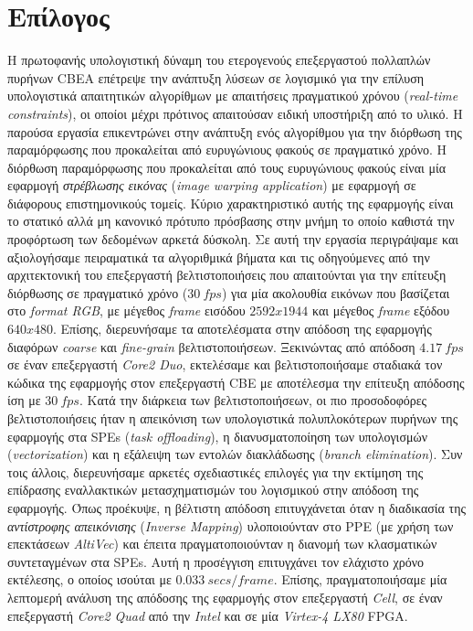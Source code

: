 ﻿\chapter{Επίλογος}
\label{chapter:chap7}
\indent
Η πρωτοφανής υπολογιστική δύναμη του ετερογενούς επεξεργαστού πολλαπλών πυρήνων \acf{CBEA} επέτρεψε την ανάπτυξη λύσεων σε λογισμικό για την επίλυση υπολογιστικά απαιτητικών αλγορίθμων με απαιτήσεις πραγματικού χρόνου (\textsl{real-time constraints}), οι οποίοι μέχρι πρότινος απαιτούσαν ειδική υποστήριξη από το υλικό. Η παρούσα εργασία επικεντρώνει στην ανάπτυξη ενός αλγορίθμου για την διόρθωση της παραμόρφωσης που προκαλείται από ευρυγώνιους φακούς σε πραγματικό χρόνο. Η διόρθωση παραμόρφωσης που προκαλείται από τους ευρυγώνιους φακούς είναι μία εφαρμογή \textsl{στρέβλωσης εικόνας} (\textsl{image warping application}) με εφαρμογή σε διάφορους επιστημονικούς τομείς. Κύριο χαρακτηριστικό αυτής της εφαρμογής είναι το στατικό αλλά μη κανονικό πρότυπο πρόσβασης στην μνήμη το οποίο καθιστά την προφόρτωση των δεδομένων αρκετά δύσκολη.\newline \indent
Σε αυτή την εργασία περιγράψαμε και αξιολογήσαμε πειραματικά τα αλγοριθμικά βήματα και τις οδηγούμενες από την αρχιτεκτονική του επεξεργαστή βελτιστοποιήσεις που απαιτούνται για την επίτευξη διόρθωσης σε πραγματικό χρόνο (\(30\ fps\)) για μία ακολουθία εικόνων που βασίζεται στο \textsl{format RGB}, με μέγεθος \textsl{frame} εισόδου \(2592x1944\) και μέγεθος \textsl{frame} εξόδου \(640x480\). Επίσης, διερευνήσαμε τα αποτελέσματα στην απόδοση της εφαρμογής διαφόρων \textsl{coarse} και \textsl{fine-grain} βελτιστοποιήσεων. Ξεκινώντας από απόδοση \(4.17\ fps\) σε έναν επεξεργαστή \textsl{Core2 Duo}, εκτελέσαμε και βελτιστοποιήσαμε σταδιακά τον κώδικα της εφαρμογής στον επεξεργαστή \ac{CBE} με αποτέλεσμα την επίτευξη απόδοσης ίση με \(30\ fps\). Κατά την διάρκεια των βελτιστοποιήσεων, οι πιο προσοδοφόρες βελτιστοποιήσεις ήταν η απεικόνιση των υπολογιστικά πολυπλοκότερων πυρήνων της εφαρμογής στα \acp{SPE} (\textsl{task offloading}), η διανυσματοποίηση των υπολογισμών (\textsl{vectorization}) και η εξάλειψη των εντολών διακλάδωσης (\textsl{branch elimination}).\newline \indent
Συν τοις άλλοις, διερευνήσαμε αρκετές σχεδιαστικές επιλογές για την εκτίμηση της επίδρασης εναλλακτικών μετασχηματισμών του λογισμικού στην απόδοση της εφαρμογής. Όπως προέκυψε, η βέλτιστη απόδοση επιτυγχάνεται όταν η διαδικασία της \textsl{αντίστροφης απεικόνισης} (\textsl{Inverse Mapping}) υλοποιούνταν στο \ac{PPE} (με χρήση των επεκτάσεων \textsl{AltiVec}) και έπειτα πραγματοποιούνταν η διανομή των κλασματικών συντεταγμένων στα \acp{SPE}. Αυτή η προσέγγιση επιτυγχάνει τον ελάχιστο χρόνο εκτέλεσης, ο οποίος ισούται με \(0.033\ secs/frame\). Επίσης, πραγματοποιήσαμε μία λεπτομερή ανάλυση της απόδοσης της εφαρμογής στον επεξεργαστή \textsl{Cell}, σε έναν επεξεργαστή \textsl{Core2 Quad} από την \textsl{Intel} και σε μία \textsl{Virtex-4 LX80} \ac{FPGA}.\newline \indent
